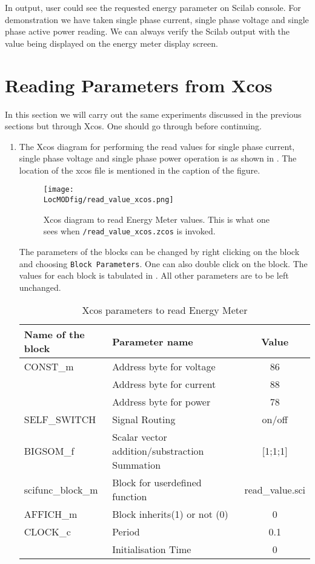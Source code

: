 In output, user could see the requested energy parameter on Scilab console. For demonstration we have taken single phase current, single phase voltage and single phase active power reading. We can always verify the Scilab output with the value being displayed on the energy meter display screen. 

\section{Reading Parameters from Xcos}
In this section we will carry out the same experiments discussed in the previous sections but through Xcos. One should go through  before continuing.

\begin{enumerate}
\item The Xcos diagram for performing the read values for single phase current, single phase voltage and single phase power operation is as shown in . The location of the xcos file is mentioned in the caption of the figure.

\begin{figure}
    \centering
    \texttt{[image: \\LocMODfig/read\_value\_xcos.png]}
    \caption[Xcos diagram to read Energy Meter values]{Xcos diagram to read Energy Meter values.  
      This is what one sees when 
      {\tt \LocMODscibrief/read\_value\_xcos.zcos} is invoked.}
    \label{fig:mod-read}
  \end{figure}
The parameters of the blocks can be changed by right clicking on the block and choosing {\tt Block Parameters}. One can also double click on the block. The values for each block is tabulated in .  All other parameters are to be left unchanged.

\begin{table}
    \centering
    \caption{Xcos parameters to read Energy Meter}
    \label{tab:mod-xcos-read}
    \begin{tabular}{llc} \hline
      Name of the block & Parameter name & Value \\ \hline
      CONST\_m & Address byte for voltage & 86  \\
      & Address byte for current & 88 \\ 
      & Address byte for power & 78\\ \hline
      SELF\_SWITCH & Signal Routing & on/off \\ \hline
      BIGSOM\_f & Scalar vector addition/substraction Summation & [1;1;1] \\ \hline
      scifunc\_block\_m & Block for user\-defined function & read\_value.sci \\ \hline 
      AFFICH\_m & Block inherits(1) or not (0) & 0 \\ \hline
      CLOCK\_c & Period & 0.1 \\
      & Initialisation Time & 0 \\ \hline
    \end{tabular}
  \end{table}

\end{enumerate}

